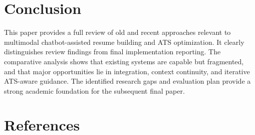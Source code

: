 \documentclass[conference]{IEEEtran}
\begin{document}
\section{Conclusion}
This paper provides a full review of old and recent approaches relevant to multimodal chatbot-assisted resume building and ATS optimization. It clearly distinguishes review findings from final implementation reporting. The comparative analysis shows that existing systems are capable but fragmented, and that major opportunities lie in integration, context continuity, and iterative ATS-aware guidance. The identified research gaps and evaluation plan provide a strong academic foundation for the subsequent final paper.

\section*{References}
\end{document}
